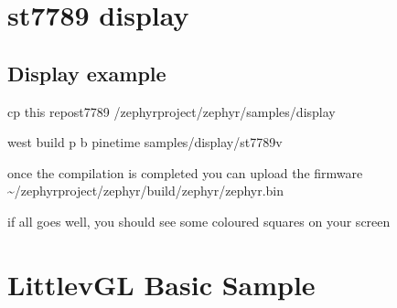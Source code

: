 \documentclass[letterpaper,10pt,english]{sphinxmanual}
\begin{document}
\chapter{st7789 display}
\label{\detokenize{display:st7789-display}}\label{\detokenize{display::doc}}

\section{Display    example}
\label{\detokenize{display:display-example}}

\begin{sphinxVerbatim}[commandchars=\\\{\}]
       

         
\end{sphinxVerbatim}

\begin{sphinxVerbatim}[commandchars=\\\{\}]
 cp this repost7789  \PYGZti{}/zephyrproject/zephyr/samples/display
\end{sphinxVerbatim}


\begin{sphinxVerbatim}[commandchars=\\\{\}]
  west build \PYGZhy{}p \PYGZhy{}b pinetime samples/display/st7789v
\end{sphinxVerbatim}

once the compilation is completed you can upload the firmware
\textasciitilde{}/zephyrproject/zephyr/build/zephyr/zephyr.bin

if all goes well, you should see some coloured squares on your screen


\chapter{LittlevGL Basic Sample}
\label{\detokenize{lvgl:littlevgl-basic-sample}}\label{\detokenize{lvgl:lvgl-sample}}\label{\detokenize{lvgl::doc}}
\end{document}
